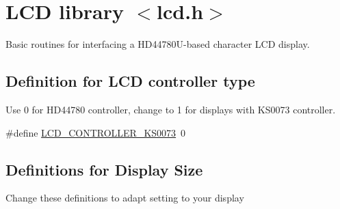 \hypertarget{group__pfleury__lcd}{}\section{L\+CD library $<$lcd.\+h$>$}
\label{group__pfleury__lcd}


Basic routines for interfacing a H\+D44780\+U-\/based character L\+CD display.  


\subsection*{Definition for L\+CD controller type}
\label{_amgrp9cebaa2a52e46760a474a1905c7f53a9}%
Use 0 for H\+D44780 controller, change to 1 for displays with K\+S0073 controller. \begin{DoxyCompactItemize}
\item 
\#define \mbox{\hyperlink{group__pfleury__lcd_ga63574b03f72a197aeee823aae95dc3b7}{L\+C\+D\+\_\+\+C\+O\+N\+T\+R\+O\+L\+L\+E\+R\+\_\+\+K\+S0073}}~0
\end{DoxyCompactItemize}
\subsection*{Definitions for Display Size}
\label{_amgrpcaec0cb1262819d89ffa7f25526cc869}%
Change these definitions to adapt setting to your display

